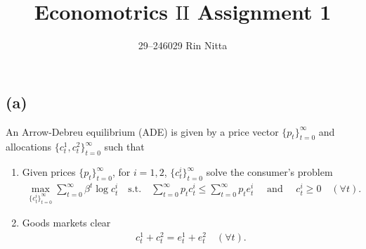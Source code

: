 \documentclass{ltjsarticle}
\title{Economotrics $\mathrm{II}$ Assignment 1}
\author{29--246029 Rin Nitta}
\begin{document}
\maketitle



\section{} %

\subsection*{(a)}
An Arrow-Debreu equilibrium (ADE) is given by a price vector $\{p_t\}_{t=0}^\infty$ and allocations $\{c_t^1, c_t^2\}_{t=0}^\infty$ such that
\begin{enumerate}
    \item Given prices $\{p_t\}_{t=0}^\infty$, for $i = 1,2$, $\{c_t^i\}_{t=0}^\infty$ solve the consumer's problem
    \begin{gather*}
        \max_{\{c_t^i\}_{t=0}^\infty} \sum_{t=0}^\infty \beta^t \log c_t^i \quad \text{s.t.} \quad \sum_{t=0}^\infty p_t c_t^i \leq \sum_{t=0}^\infty p_t e_t^i \quad \text{ and } \quad c_t^i \geq 0 \quad ( \forall t).
    \end{gather*}
    \item Goods markets clear
    \begin{gather*}
        c_t^1 + c_t^2 = e_t^1 + e_t^2 \quad ( \forall t).
    \end{gather*}
\end{enumerate}
\end{document}
